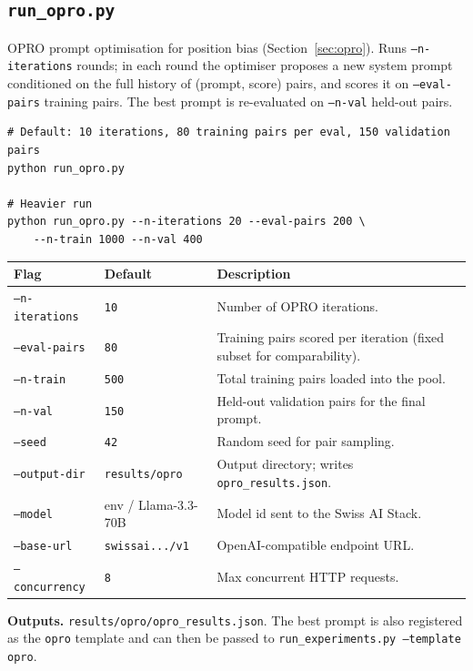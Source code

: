\subsection{\texttt{run\_opro.py}}\label{sec:cli-opro}

OPRO prompt optimisation for position bias (Section~\ref{sec:opro}). Runs
\texttt{--n-iterations} rounds; in each round the optimiser proposes a new
system prompt conditioned on the full history of (prompt, score) pairs,
and scores it on \texttt{--eval-pairs} training pairs. The best prompt is
re-evaluated on \texttt{--n-val} held-out pairs.

\begin{lstlisting}[title={\small Typical invocation}]
# Default: 10 iterations, 80 training pairs per eval, 150 validation pairs
python run_opro.py

# Heavier run
python run_opro.py --n-iterations 20 --eval-pairs 200 \
    --n-train 1000 --n-val 400
\end{lstlisting}

\begin{longtable}{@{}llp{7.5cm}@{}}
  \toprule
  \textbf{Flag} & \textbf{Default} & \textbf{Description} \\
  \midrule \endhead
  \texttt{--n-iterations} & \texttt{10}                & Number of OPRO iterations. \\
  \texttt{--eval-pairs}   & \texttt{80}                & Training pairs scored per iteration (fixed subset for comparability). \\
  \texttt{--n-train}      & \texttt{500}               & Total training pairs loaded into the pool. \\
  \texttt{--n-val}        & \texttt{150}               & Held-out validation pairs for the final prompt. \\
  \texttt{--seed}         & \texttt{42}                & Random seed for pair sampling. \\
  \texttt{--output-dir}   & \texttt{results/opro}      & Output directory; writes \texttt{opro\_results.json}. \\
  \texttt{--model}        & env / Llama-3.3-70B        & Model id sent to the Swiss AI Stack. \\
  \texttt{--base-url}     & \texttt{swissai.../v1}       & OpenAI-compatible endpoint URL. \\
  \texttt{--concurrency}  & \texttt{8}                 & Max concurrent HTTP requests. \\
  \bottomrule
\end{longtable}

\textbf{Outputs.} \texttt{results/opro/opro\_results.json}. The best prompt
is also registered as the \texttt{opro} template and can then be passed to
\texttt{run\_experiments.py --template opro}.
